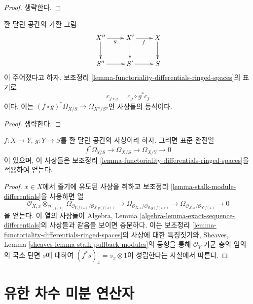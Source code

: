 \begin{proof}
생략한다.
\end{proof}

\begin{lemma}
\label{lemma-check-functoriality-differentials}
환 달린 공간의 가환 그림
$$
\xymatrix{
X'' \ar[d] \ar[r]_g & X' \ar[d] \ar[r]_f & X \ar[d] \\
S'' \ar[r] & S' \ar[r] & S
}
$$
이 주어졌다고 하자. 보조정리
\ref{lemma-functoriality-differentials-ringed-spaces}의 표기로
$$
c_{f \circ g} = c_g \circ g^* c_f
$$
이다. 이는 $(f \circ g)^*\Omega_{X/S} \to \Omega_{X''/S''}$인
사상들의 등식이다.
\end{lemma}

\begin{proof}
생략한다.
\end{proof}

\begin{lemma}
\label{lemma-triangle-differentials}
$f : X \to Y$, $g : Y \to S$를 환 달린 공간의 사상이라 하자.
그러면 표준 완전열
$$
f^*\Omega_{Y/S} \to \Omega_{X/S} \to \Omega_{X/Y} \to 0
$$
이 있으며, 이 사상들은 보조정리
\ref{lemma-functoriality-differentials-ringed-spaces}을 적용하여 얻는다.
\end{lemma}

\begin{proof}
$x \in X$에서 줄기에 유도된 사상을 취하고 보조정리
\ref{lemma-stalk-module-differentials}을 사용하면 열
$$
\mathcal{O}_{X, x} \otimes_{\mathcal{O}_{Y, f(x)}}
\Omega_{\mathcal{O}_{Y, f(x)}/\mathcal{O}_{S, g(f(x))}} \to
\Omega_{\mathcal{O}_{X, x}/\mathcal{O}_{S, g(f(x))}} \to
\Omega_{\mathcal{O}_{X, x}/\mathcal{O}_{Y, f(x)}} \to 0
$$
을 얻는다. 이 열의 사상들이 Algebra, Lemma
\ref{algebra-lemma-exact-sequence-differentials}의 사상들과 같음을
보이면 충분하다. 이는 보조정리
\ref{lemma-functoriality-differentials-ringed-spaces}의 사상에 대한
특징짓기와, Sheaves, Lemma
\ref{sheaves-lemma-stalk-pullback-modules}의 동형을 통해
$\mathcal{O}_Y$-가군 층의 임의의 국소 단면 $s$에 대하여
$(f^*s)_x = s_x \otimes 1$이 성립한다는 사실에서 따른다.
\end{proof}


















\section{유한 차수 미분 연산자}
\label{section-differential-operators}

